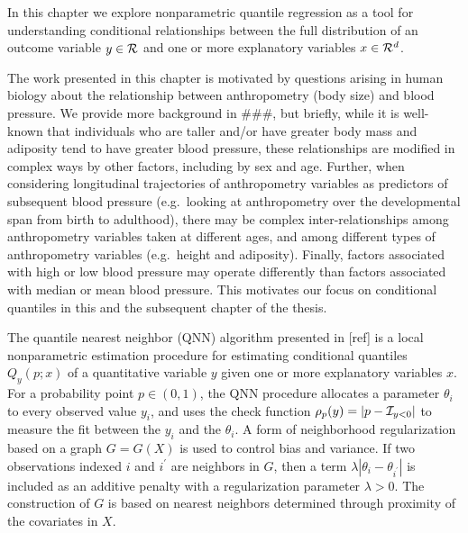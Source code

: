 In this chapter we explore nonparametric quantile regression as a tool for
understanding conditional relationships between the full distribution of
an outcome variable $y\in {\cal R}$ and one or more explanatory variables
$x \in {\cal R}^d$.

The work presented in this chapter is motivated by questions arising in
human biology about the relationship between anthropometry (body size)
and blood pressure.  We provide more background in ###, but briefly,
while it is well-known that individuals who are taller and/or have
greater body mass and adiposity tend to have greater blood pressure,
these relationships are modified in complex ways by other factors,
including by sex and age.  Further, when considering longitudinal
trajectories of anthropometry variables as predictors of subsequent blood
pressure (e.g.\ looking at anthropometry over the developmental span
from birth to adulthood), there may be complex inter-relationships among
anthropometry variables taken at different ages, and among different types
of anthropometry variables (e.g.\ height and adiposity).  Finally, factors
associated with high or low blood pressure may operate differently than
factors associated with median or mean blood pressure.  This motivates
our focus on conditional quantiles in this and the subsequent chapter
of the thesis.

The quantile nearest neighbor (QNN) algorithm presented in [ref] is
a local nonparametric estimation procedure for estimating conditional
quantiles $Q_y(p; x)$ of a quantitative variable $y$ given one or more
explanatory variables $x$.  For a probability point $p \in (0, 1)$, the
QNN procedure allocates a parameter $\theta_i$ to every observed value
$y_i$, and uses the check function $\rho_p(y) = |p - {\cal I}_{y<0}|$
to measure the fit between the $y_i$ and the $\theta_i$.  A form of
neighborhood regularization based on a graph $G = G(X)$ is used to control
bias and variance.  If two observations indexed $i$ and $i^\prime$ are
neighbors in $G$, then a term $\lambda |\theta_i - \theta_{i^\prime}|$
is included as an additive penalty with a regularization parameter
$\lambda > 0$.  The construction of $G$ is based on nearest neighbors
determined through proximity of the covariates in $X$.

